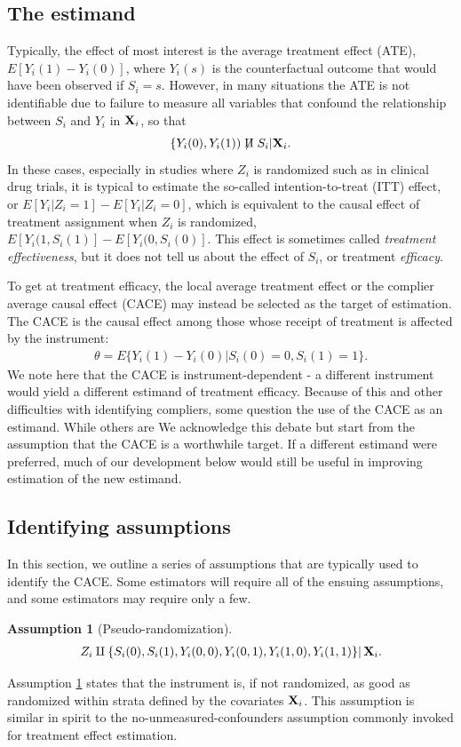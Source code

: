 \documentclass{article}
\newtheorem{assumption}{Assumption}
\begin{document}
\subsection{The estimand}
Typically, the effect of most interest is the average treatment effect (ATE), $E[Y_i(1) - Y_i(0)]$, where $Y_i(s)$ is the counterfactual outcome that would have been observed if $S_i = s$. However, in many situations the ATE is not identifiable due to failure to measure all variables that confound the relationship between $S_i$ and $Y_i$ in ${\bf X}_i$, so that 
\[
\{Y_i(0), Y_i(1)) \centernot\amalg S_i | \bX_i.
\]
In these cases, especially in studies where $Z_i$ is randomized such as in clinical drug trials, it is typical to estimate the so-called intention-to-treat (ITT) effect, or $E[Y_i | Z_i = 1] - E[Y_i | Z_i = 0]$, which is equivalent to the causal effect of treatment assignment when $Z_i$ is randomized, $E[Y_i(1, S_i(1)] - E[Y_i(0, S_i(0)]$. This effect is sometimes called \textit{treatment effectiveness}, but it does not tell us about the effect of $S_i$, or treatment \textit{efficacy}. 

To get at treatment efficacy, the local average treatment effect \citep{Angrist1995} or the complier average causal effect (CACE) \citep{little2009comparison} may instead be selected as the target of estimation. The CACE is the causal effect among those whose receipt of treatment is affected by the instrument: 
\begin{align}
\theta = E\{Y_i(1) - Y_i(0) | S_i(0) = 0, S_i(1) = 1\}. \label{cace}
\end{align}
We note here that the CACE is instrument-dependent - a different instrument would yield a different estimand of treatment efficacy. Because of this and other difficulties with identifying compliers, some \citep{} question the use of the CACE as an estimand. While others are  We acknowledge this debate but start from the assumption that the CACE is a worthwhile target. If a different estimand were preferred, much of our development below would still be useful in improving estimation of the new estimand.


\subsection{Identifying assumptions}
In this section, we outline a series of assumptions that are typically used to identify the CACE. Some estimators will require all of the ensuing assumptions, and some estimators may require only a few. 
\begin{assumption}[Pseudo-randomization] \label{iv_randomized}
    \begin{align*}
    \left.Z_i \amalg \left\{S_i(0), S_i(1), Y_i(0, 0), Y_i(0, 1), Y_i(1, 0), Y_i(1, 1)\right\}\right|{\bf X}_i.    
    \end{align*}
\end{assumption}
Assumption \ref{iv_randomized} states that the instrument is, if not randomized, as good as randomized \citep{imbens2014instrumental} within strata defined by the covariates ${\bf X}_i$. This assumption is similar in spirit to the no-unmeasured-confounders assumption commonly invoked for treatment effect estimation. 
\end{document}
